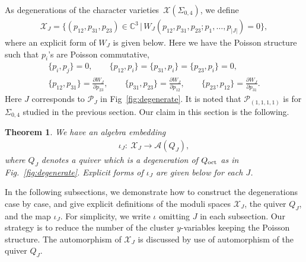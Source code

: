 \documentclass[pdftex]{sigma}
\numberwithin{equation}{section}
\newtheorem{Theorem}{Theorem}[section]
\begin{document}
As degenerations of the character varieties~$\mathcal{X}(\Sigma_{0,4})$, we define
\begin{gather*}
 \mathcal{X}_J = \big\{( p_{12}, p_{31}, p_{23}) \in \mathbb{C}^3 \,|\, W_J(p_{12}, p_{31},p_{23}; p_1,\dots, p_{|J|}) =0 \big\} ,
\end{gather*}
where an explicit form of $W_J$ is given below. Here we have the Poisson structure such that $p_i$'s are Poisson commutative,
\begin{gather*}
\{ p_i , p_j\} =0, \qquad \{ p_{12} , p_i \}= \{ p_{31}, p_i \}= \{ p_{23} , p_i\} = 0 , \\
\{ p_{12} , p_{31}\} = \frac{\partial W_J}{\partial p_{23}} ,\qquad \{ p_{31} , p_{23} \} = \frac{\partial W_J}{\partial p_{12}} ,\qquad \{ p_{23} , p_{12} \} = \frac{\partial W_J}{\partial p_{31}} .
\end{gather*}
Here $J$ corresponds to $\mathcal{P}_J$ in Fig~\ref{fig:degenerate}. It is noted that $\mathcal{P}_{(1,1,1,1)}$ is for $\Sigma_{0,4}$ studied in the previous section. Our claim in this section is the following.
\begin{Theorem} \label{thm:degenerate} We have an algebra embedding
\begin{gather*}
\iota_J\colon \ \mathcal{X}_J \to \mathcal{A}(Q_J),
\end{gather*}
where $Q_J$ denotes a quiver which is a degeneration of $Q_{\text{\rm oct}}$ as in Fig.~{\rm \ref{fig:degenerate}}. Explicit forms of $\iota_J$ are given below for each $J$.
\end{Theorem}

In the following subsections, we demonstrate how to construct the degenerations case by case, and give explicit definitions of the moduli spaces $\mathcal{X}_J$, the quiver $Q_J$, and the map $\iota_J$. For simplicity, we write $\iota$ omitting $J$ in each subsection. Our strategy is to reduce the number of the cluster $y$-variables keeping the Poisson structure. The automorphism of $\mathcal{X}_J$ is discussed by use of automorphism of the quiver $Q_J$.
\end{document}
